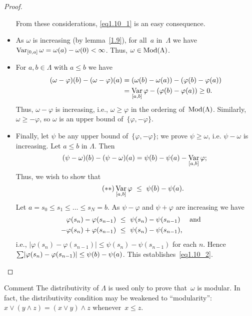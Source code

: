 \documentclass[main.tex]{subfiles}
\begin{document}
\begin{proof}
\begin{itemize}
From these considerations, \eqref{eq1.10_1} is an easy consequence.
%
\item
As $\omega$ is increasing (by lemma~\ref{1.9}),
for all~$a$ in~$\Lambda$ 
we have $\mathop{\mathrm{Var}}_{[0,a]}\omega = \omega(a)-\omega(0)<\infty$.
Thus, $\omega\in\mathrm{Mod}(\Lambda)$.
%
\item
For $a,b\in\Lambda$ with $a\leq b$ we have
\begin{align*}
(\omega - \varphi)(b) - (\omega-\varphi)(a)
  & = (\omega(b) - \omega(a)) - (\varphi(b) - \varphi(a)) \\
  & = \mathop{\mathrm{Var}}_{[a,b]}\varphi - (\varphi(b) - \varphi(a)) \ge 0
\text{.}
\end{align*}
Thus, $\omega-\varphi$ is increasing, 
i.e., $\omega\ge \varphi$ in the ordering of~$\mathrm{Mod}(\Lambda)$.
Similarly, $\omega\geq -\varphi$,
so $\omega$ is an upper bound of~$\{ \varphi, -\varphi \}$.
%
\item
Finally, 
let $\psi$ be any upper bound of~$\{\varphi,-\varphi\}$;
we prove $\psi\ge \omega$,
i.e. $\psi-\omega$ is increasing.
Let $a\leq b$ in $\Lambda$.
Then 
\begin{equation*}
(\psi-\omega)(b) - (\psi-\omega)(a)
  = \psi(b) - \psi(a) - \mathop{\mathrm{Var}}_{[a,b]}\varphi
\text{; }
\end{equation*}
Thus, 
we wish to show that
\begin{equation}
\label{eq1.10_2}  \tag{$**$}
\mathop{\mathrm{Var}}_{[a,b]}\varphi \ \leq\  \psi(b)-\psi(a) \text{.}
\end{equation}
Let $a=s_0\leq s_1 \leq \ldots \leq s_N = b$.
As $\psi-\varphi$ and $\psi+\varphi$ are increasing we have
\begin{align*}
\varphi(s_n) - \varphi(s_{n-1})
  &\  \leq\  \psi(s_n) - \psi(s_{n-1}) 
\quad\text{ and }\quad \\
-\varphi(s_n) + \varphi(s_{n-1})
  &\  \leq\  \psi(s_n) - \psi(s_{n-1})
\text{,}
\end{align*}
i.e., 
$|\varphi(s_n) - \varphi(s_{n-1})| 
  \leq \psi(s_n) - \psi(s_{n-1})$ 
for each $n$.
Hence~$\smash{\sum} |\varphi(s_n) - \varphi(s_{n-1})|
  \leq \psi (b) - \psi(a)$.
This establishes~\eqref{eq1.10_2}. \xqed
\end{itemize}
\end{proof}
\begin{psec*}{Comment}
The distributivity of $\Lambda$ is used only to prove
that~$\omega$ is modular.  
In fact, 
the distributivity condition 
may be weakened to ``modularity'':
$x\vee(y\wedge z) = (x\vee y)\wedge z$
whenever~$x\leq z$.
\end{psec*}
\end{document}
